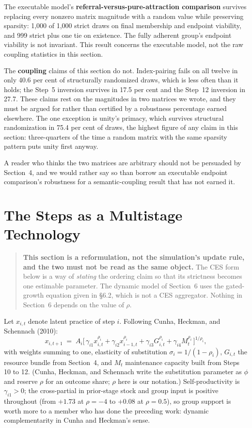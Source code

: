 \documentclass[11pt,a4paper]{article}
\begin{document}
The executable model's \textbf{referral-versus-pure-attraction comparison} survives
replacing every nonzero matrix magnitude with a random value while preserving
sparsity: 1,000 of 1,000 strict draws on final membership and endpoint viability,
and 999 strict plus one tie on existence. The fully adherent group's endpoint
viability is not invariant. This result concerns the executable model, not the raw
coupling statistics in this section.

The \textbf{coupling} claims of this section do not. Index-pairing fails on all
twelve in only 40.6 per cent of structurally randomized draws, which is less often
than it holds; the Step~5 inversion survives in 17.5 per cent and the Step~12
inversion in 27.7. These claims rest on the magnitudes in two matrices we wrote,
and they must be argued for rather than certified by a robustness percentage
earned elsewhere. The one exception is unity's primacy, which survives structural
randomization in 75.4 per cent of draws, the highest figure of any claim in this
section: three-quarters of the time a random matrix with the same sparsity pattern
puts unity first anyway.

A reader who thinks the two matrices are arbitrary should not be persuaded by
Section~4, and we would rather say so than borrow an executable endpoint
comparison's robustness for a semantic-coupling result that has not earned it.

\section{The Steps as a Multistage Technology}

\begin{quote}\small
\textbf{This section is a reformulation, not the simulation's update rule, and
the two must not be read as the same object.} The CES form below is a way of
\emph{stating} the ordering claim so that its strictness becomes one estimable
parameter. The dynamic model of Section~6 uses the gated-growth equation given in
\S6.2, which is not a CES aggregator. Nothing in Section~6 depends on the value of
$\rho$.
\end{quote}

Let $x_{i,t}$ denote latent practice of step $i$. Following Cunha, Heckman, and
Schennach (2010):
\begin{equation}
x_{i,t+1} \;=\; A_i \Big[\, \gamma_{i1} x_{i,t}^{\rho_i} + \gamma_{i2} x_{i-1,t}^{\rho_i}
 + \gamma_{i3} G_{i,t}^{\rho_i} + \gamma_{i4} M_t^{\rho_i} \,\Big]^{1/\rho_i},
\end{equation}
with weights summing to one, elasticity of substitution
$\sigma_i = 1/(1-\rho_i)$, $G_{i,t}$ the resource bundle from Section~4, and $M_t$
maintenance capacity built from Steps 10 to 12. (Cunha, Heckman, and Schennach write the
substitution parameter as $\phi$ and reserve $\rho$ for an outcome share; $\rho$ here is our
notation.) Self-productivity is
$\gamma_{i1} > 0$; the cross-partial in prior-stage stock and group input is
positive throughout (from $+1.73$ at $\rho = -4$ to $+0.08$ at $\rho = 0.5$), so
group support is worth more to a member who has done the preceding work: dynamic
complementarity in Cunha and Heckman's sense.
\end{document}
